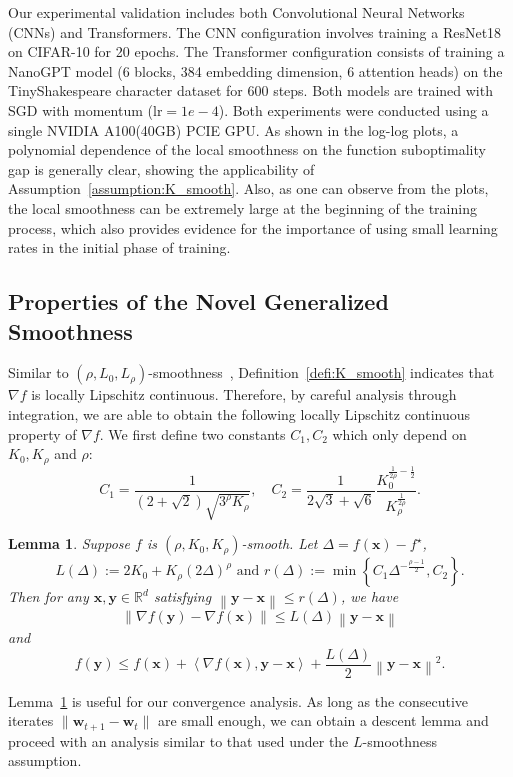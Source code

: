 \documentclass{article}
\newtheorem{lemma}{Lemma}
\newcommand{\Norm}[1]{\left\|#1\right\|}
\newcommand{\dotprod}[2]{\left\langle#1,#2\right\rangle}
\newcommand{\Kr}{K_{\rho}}
\newcommand{\bw}{\mathbf{w}}
\newcommand{\bx}{\mathbf{x}}
\newcommand{\by}{\mathbf{y}}
\newcommand{\RR}{\mathbb{R}}
\begin{document}
Our experimental validation includes both Convolutional Neural Networks (CNNs) and Transformers. The CNN configuration involves training a ResNet18 on CIFAR-10 for 20 epochs. The Transformer configuration consists of training a NanoGPT model (6 blocks, 384 embedding dimension, 6 attention heads) on the TinyShakespeare character dataset for 600 steps. Both models are trained with SGD with momentum ($\mathrm{lr}=1e-4$). Both experiments were conducted using a single NVIDIA A100(40GB) PCIE GPU.
As shown in the log-log plots, a polynomial dependence of the local smoothness on the function suboptimality gap is generally clear, showing the applicability of Assumption~\ref{assumption:K_smooth}. Also, as one can observe from the plots, the local smoothness can be extremely large at the beginning of the training process, which also provides evidence for the importance of using small learning rates in the initial phase of training.

\subsection{Properties of the Novel Generalized Smoothness}
Similar to $(\rho,L_0,L_\rho)$-smoothness~\citep{li2023convex}, 
Definition~\ref{defi:K_smooth} indicates that $\nabla f$ is locally Lipschitz continuous. Therefore, by careful analysis through integration, we are able to obtain the following locally Lipschitz continuous property of $\nabla f$.
We first define two constants $C_1, C_2$ which only depend on $K_0,\Kr$ and $\rho$:
$$C_1=\frac{1}{\left(2+\sqrt{2}\right)\sqrt{3^\rho \Kr}}, \quad
    C_2=\frac{1}{2\sqrt{3}+\sqrt{6}}\frac{K_0^{\frac{1}{2\rho}-\frac{1}{2}}}{\Kr^{\frac{1}{2\rho}}}.$$
\begin{lemma}\label{lem:improved_descent_smooth}
    Suppose $f$ is $(\rho,K_0,\Kr)$-smooth. Let $\Delta=f(\bx)-f^\star$, 
    $$L(\Delta):=2K_0+ \Kr\left(2\Delta\right)^\rho \text{ and  } r(\Delta):=\min\left\{C_1\Delta^{-\frac{\rho-1}{2}}, C_2\right\}.$$
    Then for any $\bx,\by\in\RR^d$ satisfying $\Norm{\by-\bx}\leq r(\Delta)$, we have 
    $$\Norm{\nabla f(\by)-\nabla f(\bx)}\leq L(\Delta)\Norm{\by-\bx}$$
    and
    $$f(\by)\leq f(\bx)+\dotprod{\nabla f(\bx)}{\by-\bx}+\frac{L(\Delta)}{2}\Norm{\by-\bx}^2.$$
\end{lemma}

Lemma~\ref{lem:improved_descent_smooth} is useful for our convergence analysis. As long as the consecutive iterates $\|\bw_{t+1}-\bw_t\|$ are small enough, we can obtain a descent lemma and 
proceed with an analysis similar to that used under the $L$-smoothness assumption.
\end{document}

